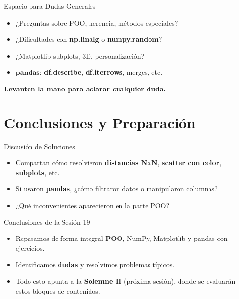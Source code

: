 \documentclass[10pt]{beamer}
\begin{document}
\begin{frame}{Espacio para Dudas Generales}
  \begin{itemize}
    \item ¿Preguntas sobre POO, herencia, métodos especiales?
    \item ¿Dificultades con \textbf{np.linalg} o \textbf{numpy.random}?
    \item ¿Matplotlib subplots, 3D, personalización?
    \item \(\textbf{pandas}\): \textbf{df.describe}, \textbf{df.iterrows}, merges, etc.
  \end{itemize}
  \vspace{0.3cm}
  \textbf{Levanten la mano para aclarar cualquier duda.}
\end{frame}

\section{Conclusiones y Preparación}

\begin{frame}{Discusión de Soluciones}
  \begin{itemize}
    \item Compartan cómo resolvieron \textbf{distancias NxN}, \textbf{scatter con color}, \textbf{subplots}, etc.
    \item Si usaron \textbf{pandas}, ¿cómo filtraron datos o manipularon columnas?
    \item ¿Qué inconvenientes aparecieron en la parte POO?  
  \end{itemize}
\end{frame}

\begin{frame}{Conclusiones de la Sesión 19}
  \begin{itemize}
    \item Repasamos de forma integral \textbf{POO}, NumPy, Matplotlib y pandas con ejercicios.
    \item Identificamos \textbf{dudas} y resolvimos problemas típicos.
    \item Todo esto apunta a la \textbf{Solemne II} (próxima sesión), donde se evaluarán estos bloques de contenidos.
  \end{itemize}
\end{frame}
\end{document}
